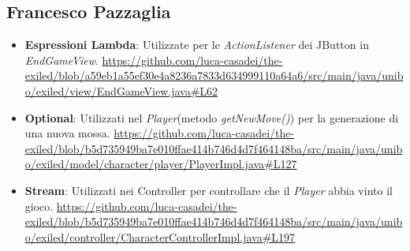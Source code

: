 \documentclass[a4paper,12pt]{report}
\begin{document}
\subsection{Francesco Pazzaglia}

\begin{itemize}
	\item \textbf{Espressioni Lambda}: Utilizzate per le \textit{ActionListener} dei JButton in \textit{EndGameView}.
	\url{https://github.com/luca-casadei/the-exiled/blob/a59eb1a55ef30e4a8236a7833d634999110a64a6/src/main/java/unibo/exiled/view/EndGameView.java#L62}
	\item \textbf{Optional}: Utilizzati nel \textit{Player}(metodo \textit{getNewMove()}) per la generazione di una nuova mossa.
	\url{https://github.com/luca-casadei/the-exiled/blob/b5d735949ba7e010ffae414b746d4d7f464148ba/src/main/java/unibo/exiled/model/character/player/PlayerImpl.java#L127}
	\item \textbf{Stream}: Utilizzati nei Controller per controllare che il \textit{Player} abbia vinto il gioco.
	\url{https://github.com/luca-casadei/the-exiled/blob/b5d735949ba7e010ffae414b746d4d7f464148ba/src/main/java/unibo/exiled/controller/CharacterControllerImpl.java#L197}
\end{itemize}
\end{document}
